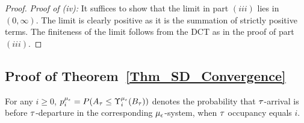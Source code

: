 \begin{proof}
	{\it  Proof of (iv):} It suffices to show that the limit in part $(iii)$ lies in $\left(0,\infty\right).$ The limit is clearly positive as it is the summation of strictly positive terms. The finiteness of the limit follows from the DCT as in the proof of part $(iii).$	
%	
\end{proof}

%
%
%
\subsection{Proof of Theorem~\ref{Thm_SD_Convergence}}
\label{sec:Thm_SD_Convergence}

For any  $i \geq 0 $,  $p_i^{\mu_\epsilon} = P (A_{\tau} \le \Upsilon_i^{\mu_\epsilon} (B_{\tau}) )$  denotes the probability that  ${\tau}$-arrival is before ${\tau}$-departure in the corresponding ${\mu_\epsilon}$-system, when
 ${\tau}$ occupancy equals $i$.

